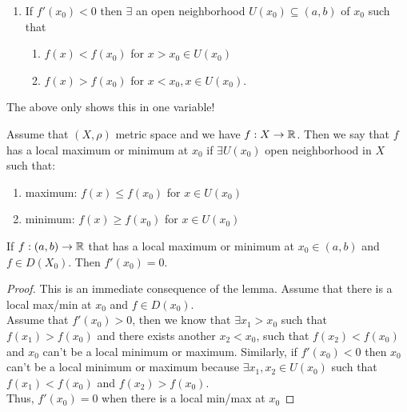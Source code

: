 \documentclass[a4paper]{article}
\begin{document}
\begin{lemma}
\begin{enumerate}
  \noindent\hrulefill

  \item If $f'(x_0) < 0$ then $\exists $ an open neighborhood $U(x_0) \subseteq (a,b)$ of $x_0$ such that 
    \begin{enumerate}
      \item $f(x) < f(x_0)$ for $x > x_0 \in U(x_0)$
      \item $f(x) > f(x_0)$ for $x < x_0, x \in U(x_0)$. 
    \end{enumerate}
  \end{enumerate}
\end{lemma}

\begin{note}
  The above only shows this in one variable!
\end{note}

\begin{definition}
  Assume that $(X, \rho)$ metric space and we have $f:X \to \mathbb{R}$. Then we say that $f $ has a local maximum or minimum at  $x_0$ if $\exists U(x_0)$ open neighborhood in $X$ such that: 
  \begin{enumerate}
    \item maximum: $f(x) \leq f(x_0)$ for $x \in U(x_0)$
    \item minimum: $f(x) \geq f(x_0)$ for $x \in U(x_0)$
  \end{enumerate}
\end{definition}

\begin{corollary}
  If $f: (a,b) \to \mathbb{R}$ that has a local maximum or minimum at $x_0 \in (a,b)$ and $f \in D(X_0)$. Then $f'(x_0) = 0$. 

  \noindent\hrulefill

  \begin{proof}
    This is an immediate consequence of the lemma. Assume that there is a local max/min at $x_0$ and $f \in D(x_0)$. \\

  Assume that $f'(x_0) > 0$, then we know that $\exists x_1 > x_0$ such that $f(x_1) > f(x_0)$ and there exists another $x_2 < x_0$, such that $f(x_2) < f(x_{0})$ and $x_0$ can't be a local minimum or maximum. Similarly, if $f'(x_0) < 0$  then $x_0$ can't be a local minimum or maximum because $\exists x_1,x_2 \in U(x_0)$ such that $f(x_1) < f(x_0)$ and $f(x_2) > f(x_0)$. \\

  Thus, $f'(x_0) = 0$ when there is a local min/max at $x_0$
  \end{proof}
\end{corollary}
\end{document}
